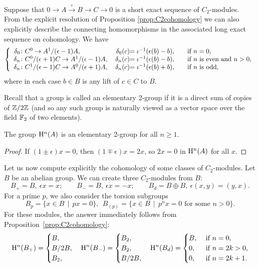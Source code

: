 \begin{remark}\label{rem:connectingmaps}
  Suppose that $0 \rightarrow A \xrightarrow{\iota} B \rightarrow C \rightarrow 0$ is a short exact sequence of $C_2$-modules. From the explicit resolution of Proposition \ref{prop:C2cohomology} we can also explicitly describe the connecting homomorphisms in the associated long exact sequence on cohomology. We have
\[
\left\{
\begin{array}{r@{}l@{\quad}r@{}l@{\qquad}l}
  \delta_0      & \colon C^0 \rightarrow A^1/(\epsilon-1)A,               & \: \delta_0(c)    & = \iota^{-1}(\epsilon(b)-b), & \text{if } n=0, \\
  \delta_n      & \colon C^0/(\epsilon+1)C \rightarrow A^1/(\epsilon-1)A, & \: \delta_n(c)    & = \iota^{-1}(\epsilon(b)-b), & \text{if } n \text{ is even and } n>0, \\
  \delta_n      & \colon C^1/(\epsilon-1)C \rightarrow A^0/(\epsilon+1)A, & \: \delta_n(c)    & = \iota^{-1}(\epsilon(b)+b), & \text{if } n \text{ is odd},
\end{array} \right.
\]
  where in each case $b \in B$ is any lift of $c \in C$ to $B$.
\end{remark}

Recall that a group is called an elementary 2-group if it is a direct sum of copies of ${\mathbb Z}/2{\mathbb Z}$ (and so any such group is naturally viewed as a vector space over the field ${\mathbb F}_2$ of two elements).
\begin{cor}\label{cor:cohomisvectorspace}
  The group $\mathrm{H}^n(A)$ is an elementary 2-group for all $n\geq 1$.
\end{cor}
\begin{proof}
If $(1 \pm \epsilon)x=0$, then $(1 \mp \epsilon)x = 2x$, so $2x=0$ in $\mathrm{H}^n(A)$ for all $x$.     
\end{proof}  

Let us now compute explicitly the cohomology of some classes of $C_2$-modules.
Let $B$ be an abelian group. We can create three $C_2$-modules from $B$:
\[
B_+ = B, \ \epsilon x = x; \qquad B_- = B, \ \epsilon x = -x; \qquad   B_d = B\oplus B, \ \epsilon (x,y) = (y,x). 
\]
For a prime $p$, we also consider the torsion subgroups
\[
B_p = \{ x\in B \,\mid\, px =0\}, \ \
B_{(p)} = \{ x\in B \,\mid\, p^nx =0 \text{ for some $n > 0$}\}.
\]
For these modules, the answer immediately follows from Proposition~\ref{prop:C2cohomology}:
\begin{equation}\label{eqn:cohomofspecialmodules}
\mathrm{H}^{n}(B_+) =
\begin{cases}
  B, \\
  B/2B, \\
  B_2,
\end{cases}
\mathrm{H}^{n}(B_-) =
\begin{cases}
  B_2, \\
  B_2, \\
  B/2B, 
\end{cases}
\mathrm{H}^{n}(B_d) =
\begin{cases}
  B, & \mbox{ if } n=0, \\
  0, & \mbox{ if } n=2k >0, \\
  0, & \mbox{ if } n=2k+1 .
\end{cases}
\end{equation}

